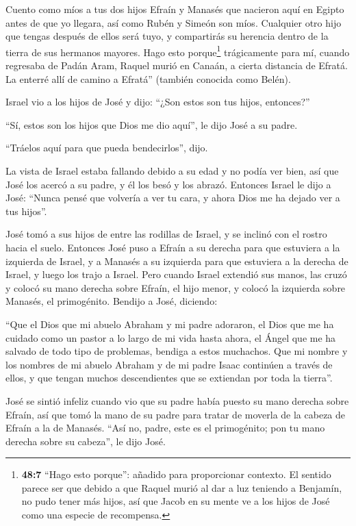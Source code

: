  Cuento como míos a tus dos hijos Efraín y Manasés que
nacieron aquí en Egipto antes de que yo llegara, así como Rubén y Simeón
son míos.  Cualquier otro hijo que tengas después de ellos
será tuyo, y compartirás su herencia dentro de la tierra de sus hermanos
mayores.  Hago esto porque\footnote{\textbf{48:7} ``Hago
  esto porque'': añadido para proporcionar contexto. El sentido parece
  ser que debido a que Raquel murió al dar a luz teniendo a Benjamín, no
  pudo tener más hijos, así que Jacob en su mente ve a los hijos de José
  como una especie de recompensa.} trágicamente para mí, cuando
regresaba de Padán Aram, Raquel murió en Canaán, a cierta distancia de
Efratá. La enterré allí de camino a Efratá'' (también conocida como
Belén).

 Israel vio a los hijos de José y dijo: ``¿Son estos son tus
hijos, entonces?''

 ``Sí, estos son los hijos que Dios me dio aquí'', le dijo
José a su padre.

``Tráelos aquí para que pueda bendecirlos'', dijo.

 La vista de Israel estaba fallando debido a su edad y no
podía ver bien, así que José los acercó a su padre, y él los besó y los
abrazó.  Entonces Israel le dijo a José: ``Nunca pensé que
volvería a ver tu cara, y ahora Dios me ha dejado ver a tus hijos''.

 José tomó a sus hijos de entre las rodillas de Israel, y
se inclinó con el rostro hacia el suelo.  Entonces José
puso a Efraín a su derecha para que estuviera a la izquierda de Israel,
y a Manasés a su izquierda para que estuviera a la derecha de Israel, y
luego los trajo a Israel.  Pero cuando Israel extendió sus
manos, las cruzó y colocó su mano derecha sobre Efraín, el hijo menor, y
colocó la izquierda sobre Manasés, el primogénito.  Bendijo
a José, diciendo:

``Que el Dios que mi abuelo Abraham y mi padre adoraron, el Dios que me
ha cuidado como un pastor a lo largo de mi vida hasta ahora,
 el Ángel que me ha salvado de todo tipo de problemas,
bendiga a estos muchachos. Que mi nombre y los nombres de mi abuelo
Abraham y de mi padre Isaac continúen a través de ellos, y que tengan
muchos descendientes que se extiendan por toda la tierra''.

 José se sintió infeliz cuando vio que su padre había
puesto su mano derecha sobre Efraín, así que tomó la mano de su padre
para tratar de moverla de la cabeza de Efraín a la de Manasés.
 ``Así no, padre, este es el primogénito; pon tu mano
derecha sobre su cabeza'', le dijo José.

